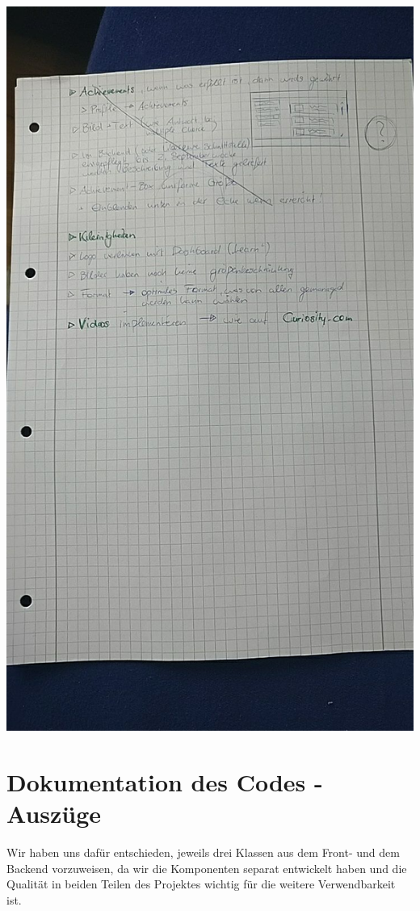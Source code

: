 \documentclass[accentcolor=tud0b,12pt,paper=a4]{tudreport}
\begin{document}
		\includegraphics[height=\textheight]{appendix/Protokolle/IMG_20170830_104113.jpg}

\chapter{Dokumentation des Codes - Auszüge}

	Wir haben uns dafür entschieden, jeweils drei Klassen aus dem Front- und dem Backend vorzuweisen, da wir die Komponenten separat entwickelt haben und die Qualität in beiden Teilen des Projektes wichtig für die weitere Verwendbarkeit ist.
\end{document}

